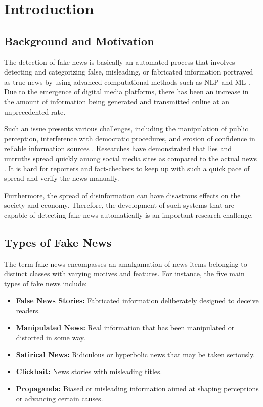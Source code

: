 \documentclass[runningheads]{llncs}
\begin{document}
\section{Introduction}
\subsection{Background and Motivation}

The detection of fake news is basically an automated process that involves detecting and categorizing false, misleading, or fabricated information portrayed as true news by using advanced computational methods such as NLP and ML \cite{Shu2020FakeNewsNet,Shu2017FakeNewsDetection}. Due to the emergence of digital media platforms, there has been an increase in the amount of information being generated and transmitted online at an unprecedented rate.

Such an issue presents various challenges, including the manipulation of public perception, interference with democratic procedures, and erosion of confidence in reliable information sources \cite{Shu2020FakeNewsNet,Shu2017FakeNewsDetection}. Researches have demonstrated that lies and untruths spread quickly among social media sites as compared to the actual news \cite{Vosoughi2018Spread}. It is hard for reporters and fact-checkers to keep up with such a quick pace of spread and verify the news manually.

Furthermore, the spread of disinformation can have disastrous effects on the society and economy. Therefore, the development of such systems that are capable of detecting fake news automatically is an important research challenge.

\subsection{Types of Fake News}

The term fake news encompasses an amalgamation of news items belonging to distinct classes with varying motives and features. For instance, the five main types of fake news include:

\begin{itemize}
\item \textbf{False News Stories:} Fabricated information deliberately designed to deceive readers.
\item \textbf{Manipulated News:} Real information that has been manipulated or distorted in some way.
\item \textbf{Satirical News:} Ridiculous or hyperbolic news that may be taken seriously.
\item \textbf{Clickbait:} News stories with misleading titles.
\item \textbf{Propaganda:} Biased or misleading information aimed at shaping perceptions or advancing certain causes.
\end{itemize}
\end{document}
